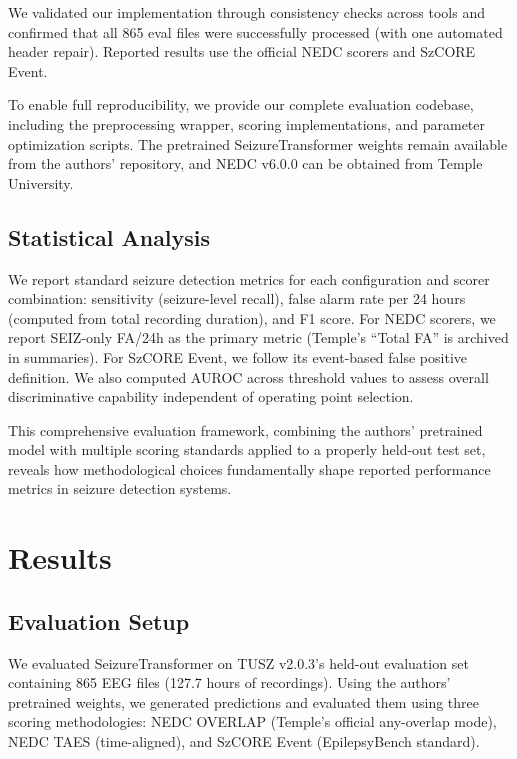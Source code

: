 \documentclass[
]{article}
\begin{document}
We validated our implementation through consistency checks across tools
and confirmed that all 865 eval files were successfully processed (with
one automated header repair). Reported results use the official NEDC
scorers and SzCORE Event.

To enable full reproducibility, we provide our complete evaluation
codebase, including the preprocessing wrapper, scoring implementations,
and parameter optimization scripts. The pretrained SeizureTransformer
weights remain available from the authors' repository, and NEDC v6.0.0
can be obtained from Temple University.

\hypertarget{statistical-analysis}{%
\subsection{Statistical Analysis}\label{statistical-analysis}}

We report standard seizure detection metrics for each configuration and
scorer combination: sensitivity (seizure-level recall), false alarm rate
per 24 hours (computed from total recording duration), and F1 score. For
NEDC scorers, we report SEIZ-only FA/24h as the primary metric (Temple's
``Total FA'' is archived in summaries). For SzCORE Event, we follow its
event-based false positive definition. We also computed AUROC across
threshold values to assess overall discriminative capability independent
of operating point selection.

This comprehensive evaluation framework, combining the authors'
pretrained model with multiple scoring standards applied to a properly
held-out test set, reveals how methodological choices fundamentally
shape reported performance metrics in seizure detection systems.

\hypertarget{results}{%
\section{Results}\label{results}}

\hypertarget{evaluation-setup}{%
\subsection{Evaluation Setup}\label{evaluation-setup}}

We evaluated SeizureTransformer on TUSZ v2.0.3's held-out evaluation set
containing 865 EEG files (127.7 hours of recordings). Using the authors'
pretrained weights, we generated predictions and evaluated them using
three scoring methodologies: NEDC OVERLAP (Temple's official any-overlap
mode), NEDC TAES (time-aligned), and SzCORE Event (EpilepsyBench
standard).
\end{document}
